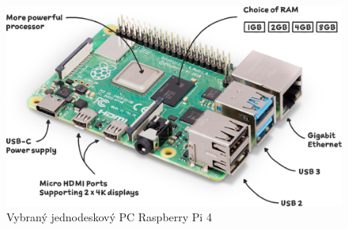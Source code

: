 
%


\begin{figure}[!h]
    \begin{center}
        \includegraphics[scale=0.3]{obrazky/raspberry-pi-4.png}
    \end{center}
    \caption{Vybraný jednodeskový PC Raspberry Pi 4 \cite{malina_obr}}
\end{figure}

